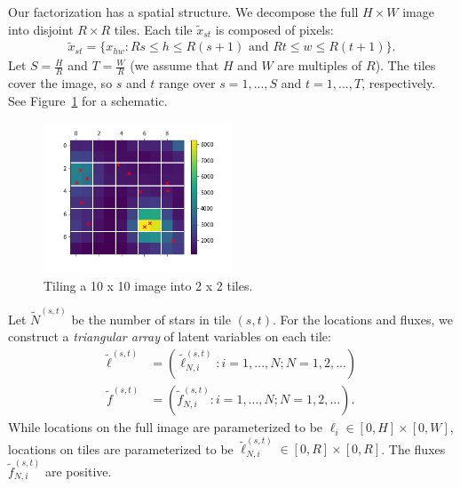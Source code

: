 Our factorization has a spatial structure. We decompose the full $H \times W$ image into disjoint $R \times R$ tiles. Each tile $\tilde x_{st}$ is composed of pixels:
\begin{align}
    \tilde x_{st} = \{x_{hw} : Rs \leq h \leq R(s+1) \text{ and } Rt \leq w \leq R(t+1)\}.
    \label{eq:tiles}
\end{align}
Let $S = \frac{H}{R}$ and $T = \frac{W}{R}$ (we assume that $H$ and $W$ are multiples of $R$). The tiles cover the image, so $s$ and $t$ range over $s = 1, ..., S$ and $t = 1, ..., T$, respectively. See Figure~\ref{fig:ex_tiles} for a schematic.
\begin{figure}[!ht]
    \centering
    \includegraphics[width = 0.5\textwidth]{figures/example_tiled.png}
    \vspace{-1cm}
    \caption{Tiling a 10 x 10 image into 2 x 2 tiles.}
    \label{fig:ex_tiles}
\end{figure}

Let $\tilde N^{(s, t)}$ be the number of stars in tile 
$(s,t)$. 
For the locations and fluxes, we construct a {\itshape triangular array}  of latent variables on each tile:
\begin{align}
    \tilde\ell^{(s, t)} &= (\tilde\ell_{N, i}^{(s, t)} : i = 1, ..., N; N = 1, 2, ...) \\
    \tilde f^{(s, t)} &= (\tilde f_{N, i}^{(s, t)} : i = 1, ..., N; N = 1, 2, ...).
\end{align}
While locations on the full image are parameterized to be
$\ell_i \in [0, H]\times[0, W]$, locations on tiles are parameterized to be $\tilde\ell_{N, i}^{(s, t)} \in [0, R]\times[0, R]$. The fluxes $\tilde f_{N, i}^{(s, t)}$ are positive. 

